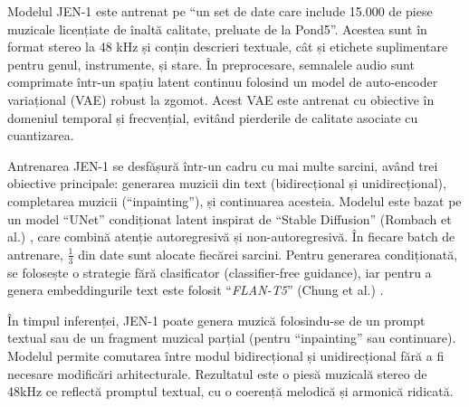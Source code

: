 Modelul JEN-1 este antrenat pe ``un set de date care include 15.000 de piese muzicale licențiate de înaltă calitate, preluate de la Pond5''. Acestea sunt în format stereo la 48 kHz și conțin descrieri textuale, cât și etichete suplimentare pentru genul, instrumente, și stare. În preprocesare, semnalele audio sunt comprimate într-un spațiu latent continuu folosind un model de auto-encoder variațional (VAE) robust la zgomot. Acest VAE este antrenat cu obiective în domeniul temporal și frecvențial, evitând pierderile de calitate asociate cu cuantizarea.

Antrenarea JEN-1 se desfășură într-un cadru cu mai multe sarcini, având trei obiective principale: generarea muzicii din text (bidirecțional și unidirecțional), completarea muzicii (``inpainting''), și continuarea acesteia. Modelul este bazat pe un model ``UNet'' condiționat latent inspirat de ``Stable Diffusion'' (Rombach et al.) \cite{rombach2022highresolutionimagesynthesislatent}, care combină atenție autoregresivă și non-autoregresivă. În fiecare batch de antrenare, $\frac{1}{3}$ din date sunt alocate fiecărei sarcini. Pentru generarea condiționată, se folosește o strategie fără clasificator (classifier-free guidance), iar pentru a genera embeddingurile text este folosit ``\textit{FLAN-T5}'' (Chung et al.) \cite{huang2018musictransformer}.

În timpul inferenței, JEN-1 poate genera muzică folosindu-se de un prompt textual sau de un fragment muzical parțial (pentru ``inpainting'' sau continuare). Modelul permite comutarea între modul bidirecțional și unidirecțional fără a fi necesare modificări arhitecturale. Rezultatul este o piesă muzicală stereo de 48kHz ce reflectă promptul textual, cu o coerență melodică și armonică ridicată.
